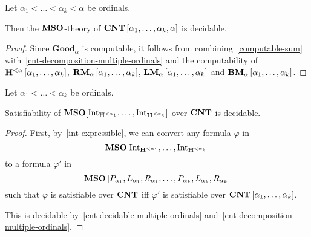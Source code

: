 \begin{lemma}\label{cnt-decidable-multiple-ordinals}
  Let $\alpha_1 < \ldots < \alpha_k < \alpha$ be ordinals.

  Then the $\mathbf{MSO}$-theory of $\mathbf{CNT} \left[ {\alpha_1, \ldots, \alpha_k, \alpha} \right]$
  is decidable.
\end{lemma}

\begin{proof}
  Since $\mathbf{Good}_{\alpha}$ is computable,
  it follows from combining~\cref{computable-sum}
  with~\cref{cnt-decomposition-multiple-ordinals} and the computability
  of $\mathbf{H}^{< \alpha} \left[ {\alpha_1, \ldots, \alpha_k} \right]$,
  $\mathbf{RM}_{\alpha} \left[ {\alpha_1, \ldots, \alpha_k} \right]$,
  $\mathbf{LM}_{\alpha} \left[ {\alpha_1, \ldots, \alpha_k} \right]$ and
  $\mathbf{BM}_{\alpha} \left[ {\alpha_1, \ldots, \alpha_k} \right]$.
\end{proof}

\begin{theorem}\label{multiple-ordinals-satisfiability}
  Let $\alpha_1 < \ldots < \alpha_k$ be ordinals.

  Satisfiability of $\mathbf{MSO}[\mathrm{Int}_{\mathbf{H}^{< \alpha_1}}, \ldots, \mathrm{Int}_{\mathbf{H}^{< \alpha_k}}]$
  over $\mathbf{CNT}$ is decidable.
\end{theorem}

\begin{proof}
  First, by~\cref{int-expressible}, we can convert
  any formula $\varphi$ in \[
    \mathbf{MSO}[\mathrm{Int}_{\mathbf{H}^{< \alpha_1}}, \ldots, \mathrm{Int}_{\mathbf{H}^{< \alpha_k}}]
  \]
  to a formula $\varphi'$ in \[
    \mathbf{MSO} \left[ {P_{\alpha_1}, L_{\alpha_1}, R_{\alpha_1}, \ldots, P_{\alpha_k}, L_{\alpha_k}, R_{\alpha_k}} \right]
  \]
  such that $\varphi$ is satisfiable over $\mathbf{CNT}$
  iff $\varphi'$ is satisfiable over $\mathbf{CNT} \left[ {\alpha_1, \ldots, \alpha_k} \right]$.

  This is decidable by~\cref{cnt-decidable-multiple-ordinals} and~\cref{cnt-decomposition-multiple-ordinals}.
\end{proof}